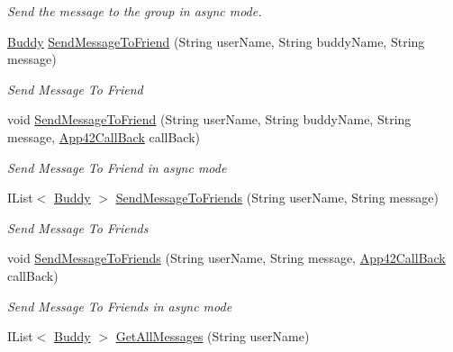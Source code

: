 \begin{DoxyCompactItemize}
\begin{DoxyCompactList}\small\item\em Send the message to the group in async mode. \end{DoxyCompactList}\item 
\hyperlink{classcom_1_1shephertz_1_1app42_1_1paas_1_1sdk_1_1csharp_1_1buddy_1_1_buddy}{Buddy} \hyperlink{classcom_1_1shephertz_1_1app42_1_1paas_1_1sdk_1_1csharp_1_1buddy_1_1_buddy_service_a70c8484c16a335859923369c68b7e9e3}{Send\+Message\+To\+Friend} (String user\+Name, String buddy\+Name, String message)
\begin{DoxyCompactList}\small\item\em Send Message To Friend \end{DoxyCompactList}\item 
void \hyperlink{classcom_1_1shephertz_1_1app42_1_1paas_1_1sdk_1_1csharp_1_1buddy_1_1_buddy_service_a1add6b1768bb5d1e559d920d4b95cc32}{Send\+Message\+To\+Friend} (String user\+Name, String buddy\+Name, String message, \hyperlink{interfacecom_1_1shephertz_1_1app42_1_1paas_1_1sdk_1_1csharp_1_1_app42_call_back}{App42\+Call\+Back} call\+Back)
\begin{DoxyCompactList}\small\item\em Send Message To Friend in async mode \end{DoxyCompactList}\item 
I\+List$<$ \hyperlink{classcom_1_1shephertz_1_1app42_1_1paas_1_1sdk_1_1csharp_1_1buddy_1_1_buddy}{Buddy} $>$ \hyperlink{classcom_1_1shephertz_1_1app42_1_1paas_1_1sdk_1_1csharp_1_1buddy_1_1_buddy_service_aea4d38b296404a749c44180672913ff9}{Send\+Message\+To\+Friends} (String user\+Name, String message)
\begin{DoxyCompactList}\small\item\em Send Message To Friends \end{DoxyCompactList}\item 
void \hyperlink{classcom_1_1shephertz_1_1app42_1_1paas_1_1sdk_1_1csharp_1_1buddy_1_1_buddy_service_aa70a3b64ae00e0ab188873d3ccd0ba28}{Send\+Message\+To\+Friends} (String user\+Name, String message, \hyperlink{interfacecom_1_1shephertz_1_1app42_1_1paas_1_1sdk_1_1csharp_1_1_app42_call_back}{App42\+Call\+Back} call\+Back)
\begin{DoxyCompactList}\small\item\em Send Message To Friends in async mode \end{DoxyCompactList}\item 
I\+List$<$ \hyperlink{classcom_1_1shephertz_1_1app42_1_1paas_1_1sdk_1_1csharp_1_1buddy_1_1_buddy}{Buddy} $>$ \hyperlink{classcom_1_1shephertz_1_1app42_1_1paas_1_1sdk_1_1csharp_1_1buddy_1_1_buddy_service_a84f44f883a7faf05c00aa324852223be}{Get\+All\+Messages} (String user\+Name)

\end{DoxyCompactItemize}
